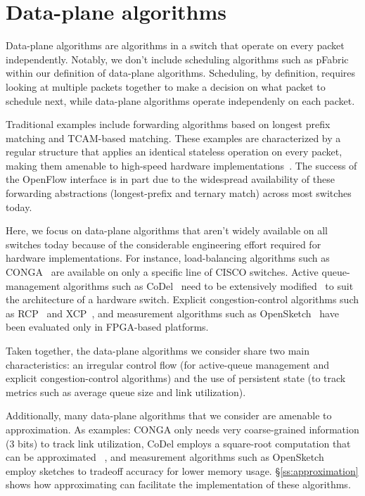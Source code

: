 \section{Data-plane algorithms}
\label{s:dataplane}

Data-plane algorithms are algorithms in a switch that operate on every packet
independently.  Notably, we don't include scheduling algorithms such as pFabric
within our definition of data-plane algorithms. Scheduling, by definition,
requires looking at multiple packets together to make a decision on what packet
to schedule next, while data-plane algorithms operate independenly on each
packet.

Traditional examples include forwarding algorithms based on
longest prefix matching and TCAM-based matching. These examples are
characterized by a regular structure that applies an identical stateless
operation on every packet, making them amenable to high-speed hardware
implementations~\cite{georges_papers_on_the_topic}. The success of the OpenFlow
interface is in part due to the widespread availability of these forwarding
abstractions (longest-prefix and ternary match) across most switches today.

 Here, we focus on data-plane algorithms that aren't widely available on all
switches today because of the considerable engineering effort required for
hardware implementations. For instance, load-balancing algorithms such as
CONGA~\cite{conga} are available on only a specific line of CISCO switches.
Active queue-management algorithms such as CoDel~\cite{codel} need to be
extensively modified~\cite{pie} to suit the architecture of a hardware switch.
Explicit congestion-control algorithms such as RCP~\cite{rcp} and
XCP~\cite{xcp}, and measurement algorithms such as OpenSketch~\cite{opensketch}
have been evaluated only in FPGA-based platforms.

Taken together, the data-plane algorithms we consider share two main
characteristics: an irregular control flow (for active-queue management and
explicit congestion-control algorithms) and the use of persistent state (to
track metrics such as average queue size and link utilization).

Additionally, many data-plane algorithms that we consider are amenable to
approximation. As examples: CONGA only needs very coarse-grained information (3
bits) to track link utilization, CoDel employs a square-root computation that
can be approximated ~\cite{codel_notes}, and measurement algorithms such as
OpenSketch~\cite{opensketch} employ sketches to tradeoff accuracy for lower
memory usage. \S\ref{ss:approximation} shows how approximating can facilitate
the implementation of these algorithms.
